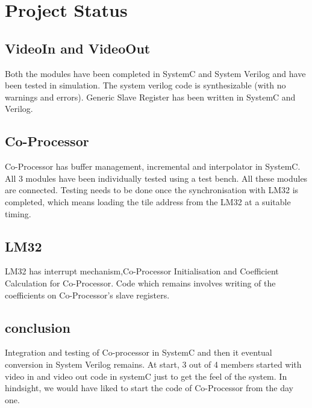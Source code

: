 

\section{Project Status}

\subsection{VideoIn and VideoOut}
Both the modules have been completed in SystemC and System Verilog and have been tested in simulation. The system verilog code is synthesizable (with no warnings and errors). Generic Slave Register has been written in SystemC and Verilog. 

\subsection{Co-Processor}
Co-Processor has buffer management, incremental and interpolator in SystemC. All 3 modules have been individually tested using a test bench. All these modules are connected. Testing needs to be done once the synchronisation with LM32 is completed, which means loading the tile address from the LM32 at a suitable timing. 

\subsection{LM32}
LM32 has interrupt mechanism,Co-Processor Initialisation and Coefficient Calculation for Co-Processor. Code which remains involves writing of the coefficients on Co-Processor's slave registers.

\subsection{conclusion}
Integration and testing of Co-processor in SystemC and then it eventual conversion in System Verilog remains. At start, 3 out of 4 members started with video in and video out code in systemC just to get the feel of the system. In hindsight, we would have liked to start the code of Co-Processor from the day one.

